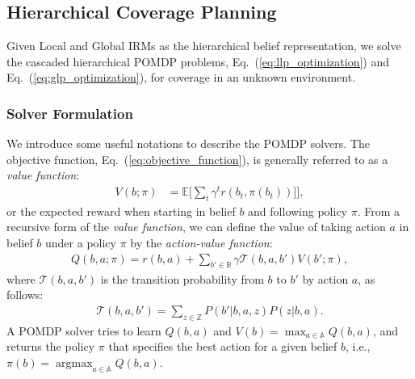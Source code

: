 \documentclass[letterpaper]{article} %
\newcommand{\ph}[1]{{\textbf{#1}:}} %
\newcommand{\argmax}{\mathop{\mathrm{argmax}}}
\begin{document}
\subsection{Hierarchical Coverage Planning} \label{ssec:belief-planners}

Given Local and Global IRMs as the hierarchical belief representation, we solve the cascaded hierarchical POMDP problems, Eq.~(\ref{eq:llp_optimization}) and Eq.~(\ref{eq:glp_optimization}), for coverage in an unknown environment.

\subsubsection{Solver Formulation} \hfill

\noindent
We introduce some useful notations to describe the POMDP solvers.
The objective function, Eq.~(\ref{eq:objective_function}), is generally referred to as a \textit{value function}: 
\begin{align}
  V(b; \pi) &= \mathbb{E} \Big[ \sum_t \gamma^t r(b_t, \pi(b_t))] \Big],
\end{align}
%
or the expected reward when starting in belief $b$ and following policy $\pi$.
From a recursive form of the \textit{value function}, we can define the value of taking action $a$ in belief $b$ under a policy $\pi$ by the \textit{action-value function}:
\begin{align}
  Q(b, a; \pi) = r(b, a) + \sum_{b' \in \mathbb{B}} \gamma \mathcal{T}(b, a, b') V(b'; \pi),
  \label{eq:q_function}
\end{align}
where $\mathcal{T}(b, a, b')$ is the transition probability from $b$ to $b'$ by action $a$, as follows:
\begin{align}
  \mathcal{T}(b, a, b') = \sum_{z \in \mathbb{Z}} P(b' | b, a, z) P(z | b, a).
\end{align}
A POMDP solver tries to learn $Q(b, a)$ and $V(b) = \max_{a \in \mathbb{A}} Q(b, a)$, and returns the policy $\pi$ that specifies the best action for a given belief $b$, i.e., $\pi(b) = \argmax_{a \in \mathbb{A}} Q(b, a)$.
\end{document}
